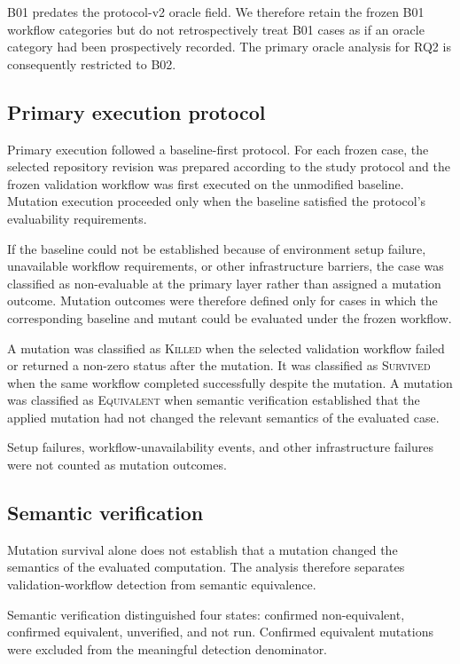 B01 predates the protocol-v2 oracle field. We therefore retain the frozen B01
workflow categories but do not retrospectively treat B01 cases as if an oracle
category had been prospectively recorded. The primary oracle analysis for RQ2
is consequently restricted to B02.


\subsection{Primary execution protocol}
\label{sec:primary-execution}

Primary execution followed a baseline-first protocol. For each frozen case,
the selected repository revision was prepared according to the study protocol
and the frozen validation workflow was first executed on the unmodified
baseline. Mutation execution proceeded only when the baseline satisfied the
protocol's evaluability requirements.

If the baseline could not be established because of environment setup failure,
unavailable workflow requirements, or other infrastructure barriers, the case
was classified as non-evaluable at the primary layer rather than assigned a
mutation outcome. Mutation outcomes were therefore defined only for cases in
which the corresponding baseline and mutant could be evaluated under the
frozen workflow.

A mutation was classified as \textsc{Killed} when the selected validation
workflow failed or returned a non-zero status after the mutation. It was
classified as \textsc{Survived} when the same workflow completed successfully
despite the mutation. A mutation was classified as \textsc{Equivalent} when
semantic verification established that the applied mutation had not changed
the relevant semantics of the evaluated case.

Setup failures, workflow-unavailability events, and other infrastructure
failures were not counted as mutation outcomes.


\subsection{Semantic verification}
\label{sec:semantic-verification}

Mutation survival alone does not establish that a mutation changed the
semantics of the evaluated computation. The analysis therefore separates
validation-workflow detection from semantic equivalence.

Semantic verification distinguished four states: confirmed
non-equivalent, confirmed equivalent, unverified, and not run. Confirmed
equivalent mutations were excluded from the meaningful detection denominator.


